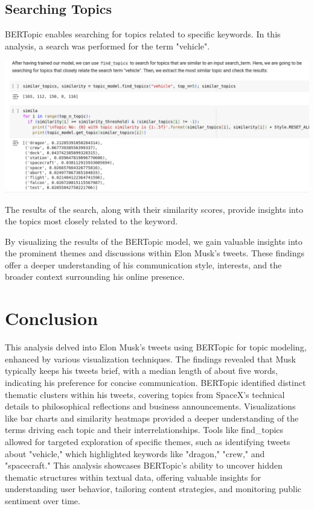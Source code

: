 \documentclass[12pt]{article}
\begin{document}
\subsection{Searching Topics}
BERTopic enables searching for topics related to specific keywords. In this analysis, a search was performed for the term "vehicle". \\
\begin{minipage}{0.48\textwidth}
    \centering
    \includegraphics[width=\linewidth]{search.png}
        \label{fig:search}
    \end{minipage}\hfill
The results of the search, along with their similarity scores, provide insights into the topics most closely related to the keyword.

By visualizing the results of the BERTopic model, we gain valuable insights into the prominent themes and discussions within Elon Musk's tweets. These findings offer a deeper understanding of his communication style, interests, and the broader context surrounding his online presence.

\section{Conclusion}
This analysis delved into Elon Musk's tweets using BERTopic for topic modeling, enhanced by various visualization techniques. The findings revealed that Musk typically keeps his tweets brief, with a median length of about five words, indicating his preference for concise communication. BERTopic identified distinct thematic clusters within his tweets, covering topics from SpaceX's technical details to philosophical reflections and business announcements. Visualizations like bar charts and similarity heatmaps provided a deeper understanding of the terms driving each topic and their interrelationships. Tools like find\_topics allowed for targeted exploration of specific themes, such as identifying tweets about "vehicle," which highlighted keywords like "dragon," "crew," and "spacecraft." This analysis showcases BERTopic's ability to uncover hidden thematic structures within textual data, offering valuable insights for understanding user behavior, tailoring content strategies, and monitoring public sentiment over time.
\end{document}
